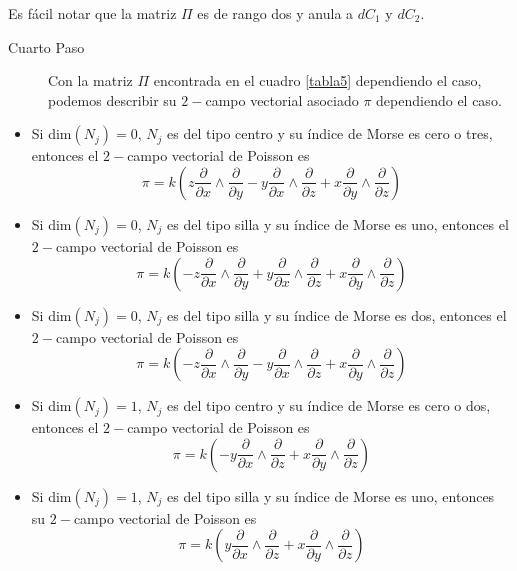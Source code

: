 \documentclass[a4paper,10pt]{book}
\begin{document}
Es f\'acil notar que la matriz $\Pi$ es de rango dos y anula a $d C_{1}$ y $d C_{2}$.

\begin{description}
    \item[Cuarto Paso] Con la matriz $\Pi$ encontrada en el cuadro \ref{tabla5} dependiendo el caso, podemos describir su $2-$campo vectorial asociado $\pi$ dependiendo el caso.  
\end{description}
\begin{itemize}
    \item Si {\rm dim$(N_{j})=0$}, $N_{j}$ es del tipo centro y su \'indice de Morse es cero o tres, entonces el $2-$campo vectorial de Poisson es
    \begin{equation}\label{pi1}
    \pi = k\left(z \frac{\partial}{\partial x}\wedge\frac{\partial}{\partial y} - y\frac{\partial}{\partial x}\wedge\frac{\partial}{\partial z} + x\frac{\partial}{\partial y}\wedge\frac{\partial}{\partial z}\right)
    \end{equation}
    \item Si {\rm dim$(N_{j})=0$}, $N_{j}$ es del tipo silla y su \'indice de Morse es uno, entonces el $2-$campo vectorial de Poisson es
    \begin{equation}\label{pi2}
    \pi = k\left(-z \frac{\partial}{\partial x}\wedge\frac{\partial}{\partial y} + y\frac{\partial}{\partial x}\wedge\frac{\partial}{\partial z} + x\frac{\partial}{\partial y}\wedge\frac{\partial}{\partial z}\right)
    \end{equation}
    \item Si {\rm dim$(N_{j})=0$}, $N_{j}$ es del tipo silla y su \'indice de Morse es dos, entonces el $2-$campo vectorial de Poisson es
    \begin{equation}\label{pi3}
    \pi = k\left(-z \frac{\partial}{\partial x}\wedge\frac{\partial}{\partial y} - y\frac{\partial}{\partial x}\wedge\frac{\partial}{\partial z} + x\frac{\partial}{\partial y}\wedge\frac{\partial}{\partial z}\right)
    \end{equation}
    \item Si {\rm dim$(N_{j})=1$}, $N_{j}$ es del tipo centro y su \'indice de Morse es cero o dos, entonces el $2-$campo vectorial de Poisson es
    \begin{equation}\label{pi4}
    \pi = k\left(-y\frac{\partial}{\partial x}\wedge\frac{\partial}{\partial z} + x\frac{\partial}{\partial y}\wedge\frac{\partial}{\partial z}\right)
    \end{equation}
    \item Si {\rm dim$(N_{j})=1$}, $N_{j}$ es del tipo silla y su \'indice de Morse es uno, entonces su $2-$campo vectorial de Poisson es
    \begin{equation}\label{pi5}
    \pi = k\left(y\frac{\partial}{\partial x}\wedge\frac{\partial}{\partial z} + x\frac{\partial}{\partial y}\wedge\frac{\partial}{\partial z}\right)
    \end{equation}
\end{itemize}
\end{document}
